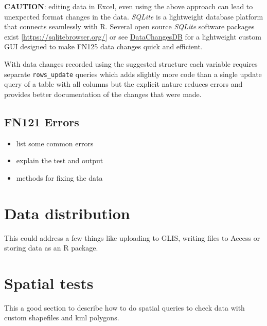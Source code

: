 \documentclass[
]{book}
\providecommand{\tightlist}{%
  \setlength{\itemsep}{0pt}\setlength{\parskip}{0pt}}
\begin{document}
\textbf{CAUTION}: editing data in Excel, even using the above approach can lead to unexpected format changes in the data. \emph{SQLite} is a lightweight database platform that connects seamlessly with R. Several open source \emph{SQLite} software packages exist {[}\url{https://sqlitebrowser.org/}{]} or see \href{https://github.com/HoldenJe/DataChangesDB}{DataChangesDB} for a lightweight custom GUI designed to make FN125 data changes quick and efficient.

With data changes recorded using the suggested structure each variable requires separate \texttt{rows\_update} queries which adds slightly more code than a single update query of a table with all columns but the explicit nature reduces errors and provides better documentation of the changes that were made.

\hypertarget{fn121-errors}{%
\section{FN121 Errors}\label{fn121-errors}}

\begin{itemize}
\tightlist
\item
  list some common errors
\item
  explain the test and output
\item
  methods for fixing the data
\end{itemize}

\hypertarget{data-distribution}{%
\chapter{Data distribution}\label{data-distribution}}

This could address a few things like uploading to GLIS, writing files to Access or storing data as an R package.

\hypertarget{spatial-tests}{%
\chapter{Spatial tests}\label{spatial-tests}}

This a good section to describe how to do spatial queries to check data with custom shapefiles and kml polygons.
\end{document}
